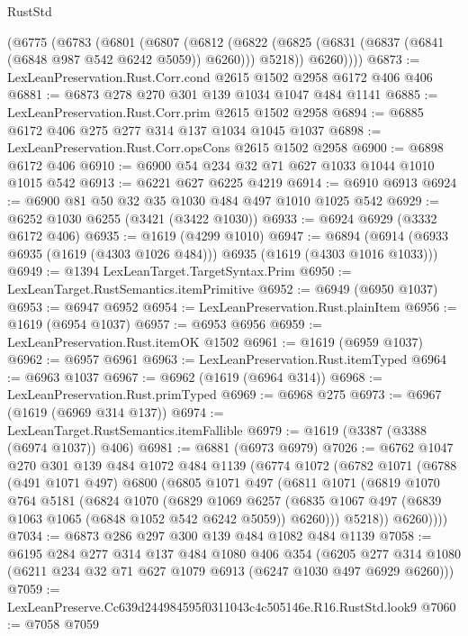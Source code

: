 \begin{lexlean}{RustStd}
\begin{coremodule}
    (@6775
      (@6783
        (@6801
          (@6807
            (@6812
              (@6822 (@6825 (@6831 (@6837 (@6841 (@6848 @987 @542 @6242 @5059)) @6260))) @5218))
            @6260))))
@6873 := LexLeanPreservation.Rust.Corr.cond @2615 @1502 @2958 @6172 @406 @406
@6881 := @6873 @278 @270 @301 @139 @1034 @1047 @484 @1141
@6885 := LexLeanPreservation.Rust.Corr.prim @2615 @1502 @2958
@6894 := @6885 @6172 @406 @275 @277 @314 @137 @1034 @1045 @1037
@6898 := LexLeanPreservation.Rust.Corr.opsCons @2615 @1502 @2958
@6900 := @6898 @6172 @406
@6910 := @6900 @54 @234 @32 @71 @627 @1033 @1044 @1010 @1015 @542
@6913 := @6221 @627 @6225 @4219
@6914 := @6910 @6913
@6924 := @6900 @81 @50 @32 @35 @1030 @484 @497 @1010 @1025 @542
@6929 := @6252 @1030 @6255 (@3421 (@3422 @1030))
@6933 := @6924 @6929 (@3332 @6172 @406)
@6935 := @1619 (@4299 @1010)
@6947 := @6894 (@6914 (@6933 @6935 (@1619 (@4303 @1026 @484))) @6935 (@1619 (@4303 @1016 @1033)))
@6949 := @1394 LexLeanTarget.TargetSyntax.Prim
@6950 := LexLeanTarget.RustSemantics.itemPrimitive
@6952 := @6949 (@6950 @1037)
@6953 := @6947 @6952
@6954 := LexLeanPreservation.Rust.plainItem
@6956 := @1619 (@6954 @1037)
@6957 := @6953 @6956
@6959 := LexLeanPreservation.Rust.itemOK @1502
@6961 := @1619 (@6959 @1037)
@6962 := @6957 @6961
@6963 := LexLeanPreservation.Rust.itemTyped
@6964 := @6963 @1037
@6967 := @6962 (@1619 (@6964 @314))
@6968 := LexLeanPreservation.Rust.primTyped
@6969 := @6968 @275
@6973 := @6967 (@1619 (@6969 @314 @137))
@6974 := LexLeanTarget.RustSemantics.itemFallible
@6979 := @1619 (@3387 (@3388 (@6974 @1037)) @406)
@6981 := @6881 (@6973 @6979)
@7026 := @6762
    @1047
    @270
    @301
    @139
    @484
    @1072
    @484
    @1139
    (@6774
      @1072
      (@6782
        @1071
        (@6788
          (@491 @1071 @497)
          @6800
          (@6805
            @1071
            @497
            (@6811
              @1071
              (@6819
                @1070
                @764
                @5181
                (@6824
                  @1070
                  (@6829
                    @1069
                    @6257
                    (@6835 @1067 @497 (@6839 @1063 @1065 (@6848 @1052 @542 @6242 @5059)) @6260)))
                @5218))
            @6260))))
@7034 := @6873 @286 @297 @300 @139 @484 @1082 @484 @1139
@7058 := @6195
    @284
    @277
    @314
    @137
    @484
    @1080
    @406
    @354
    (@6205 @277 @314 @1080 (@6211 @234 @32 @71 @627 @1079 @6913 (@6247 @1030 @497 @6929 @6260)))
@7059 := LexLeanPreserve.Cc639d244984595f0311043c4c505146e.R16.RustStd.look9
@7060 := @7058 @7059

\end{coremodule}
\end{lexlean}
